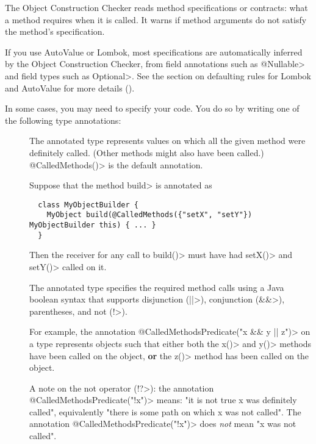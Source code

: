 
The Object Construction Checker reads method specifications or contracts:  what a method requires when it is called.
It warns if method arguments do not satisfy the method's specification.

If you use AutoValue or Lombok, most specifications are automatically
inferred by the Object Construction Checker, from field annotations such as
\<@Nullable> and field types such as \<Optional>. See the
section on defaulting rules for Lombok and AutoValue for more details
().

In some cases, you may need to specify your code. You do so by writing one of the following type
annotations:
\begin{description}
\item[]
  The annotated type represents values on which all the given method were definitely called.
  (Other methods might also have been called.) \<@CalledMethods()> is the default annotation.

  Suppose that the method \<build> is annotated as

  \begin{Verbatim}
  class MyObjectBuilder {
    MyObject build(@CalledMethods({"setX", "setY"}) MyObjectBuilder this) { ... }
  }
  \end{Verbatim}

  Then the receiver for any call to \<build()> must have had \<setX()> and \<setY()> called on it.

\item[]
  The annotated type specifies the required method calls using a Java boolean syntax that supports
  disjunction (\<||>), conjunction (\<&&>), parentheses, and not (\<!>).

  For example, the annotation \<@CalledMethodsPredicate("x && y || z")> on a type represents
  objects such that either both the  \<x()> and \<y()> methods have been called on the object, \textbf{or}
  the \<z()> method has been called on the object.

  A note on the not operator (\<!?>): the annotation \<@CalledMethodsPredicate("!x")> means: "it is not true x was
  definitely called", equivalently "there is some path on which x was not called".
  The annotation \<@CalledMethodsPredicate("!x")> does \emph{not} mean "x was not called".


\end{description}

